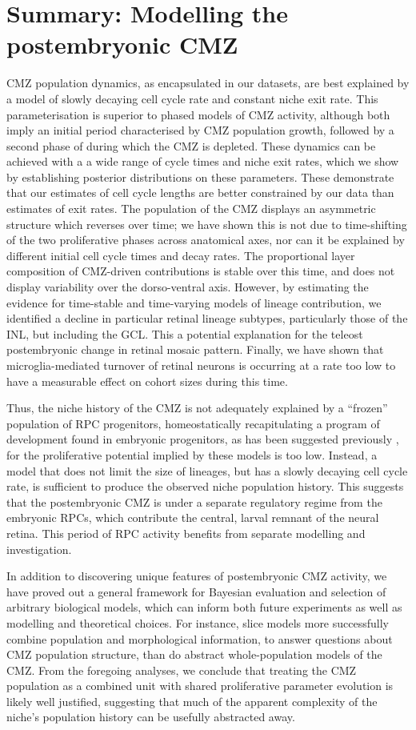 \section{Summary: Modelling the postembryonic CMZ}
CMZ population dynamics, as encapsulated in our datasets, are best explained by a model of slowly decaying cell cycle rate and constant niche exit rate. This parameterisation is superior to phased models of CMZ activity, although both imply an initial period characterised by CMZ population growth, followed by a second phase of during which the CMZ is depleted. These dynamics can be achieved with a a wide range of cycle times and niche exit rates, which we show by establishing posterior distributions on these parameters. These demonstrate that our estimates of cell cycle lengths are better constrained by our data than estimates of exit rates. The population of the CMZ displays an asymmetric structure which reverses over time; we have shown this is not due to time-shifting of the two proliferative phases across anatomical axes, nor can it be explained by different initial cell cycle times and decay rates. The proportional layer composition of CMZ-driven contributions is stable over this time, and does not display variability over the dorso-ventral axis. However, by estimating the evidence for time-stable and time-varying models of lineage contribution, we identified a decline in particular retinal lineage subtypes, particularly those of the INL, but including the GCL. This a potential explanation for the teleost postembryonic change in retinal mosaic pattern. Finally, we have shown that microglia-mediated turnover of retinal neurons is occurring at a rate too low to have a measurable effect on cohort sizes during this time.

Thus, the niche history of the CMZ is not adequately explained by a ``frozen'' population of RPC progenitors, homeostatically recapitulating a program of development found in embryonic progenitors, as has been suggested previously \cite{Harris1998,Wan2016}, for the proliferative potential implied by these models is too low. Instead, a model that does not limit the size of lineages, but has a slowly decaying cell cycle rate, is sufficient to produce the observed niche population history. This suggests that the postembryonic CMZ is under a separate regulatory regime from the embryonic RPCs, which contribute the central, larval remnant of the neural retina. This period of RPC activity benefits from separate modelling and investigation.

In addition to discovering unique features of postembryonic CMZ activity, we have proved out a general framework for Bayesian evaluation and selection of arbitrary biological models, which can inform both future experiments as well as modelling and theoretical choices. For instance, slice models more successfully combine population and morphological information, to answer questions about CMZ population structure, than do abstract whole-population models of the CMZ. From the foregoing analyses, we conclude that treating the CMZ population as a combined unit with shared proliferative parameter evolution is likely well justified, suggesting that much of the apparent complexity of the niche's population history can be usefully abstracted away.

